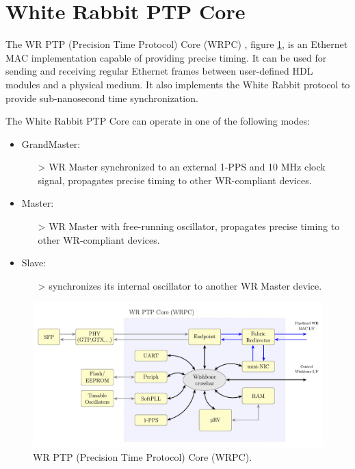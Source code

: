 \newpage
\section{White Rabbit PTP Core}

The WR PTP (Precision Time Protocol) Core (WRPC) \cite{WR-core:wiki} \cite{WR-core:manual} \cite{WRPC:ohwr}, figure \ref{fig:WRPC}, is an Ethernet MAC implementation capable of providing precise timing. 
It can be used for sending and receiving regular Ethernet frames between user-defined HDL modules and a physical medium. 
It also implements the White Rabbit protocol to provide sub-nanosecond time synchronization.

\vspace{5 mm}

\noindent The White Rabbit PTP Core can operate in one of the following modes:
 
\begin{itemize}
\item GrandMaster:
    \begin{itemize}
    \item[>] WR Master synchronized to an external 1-PPS and 10 MHz clock signal, propagates precise timing to other WR-compliant devices.
    \end{itemize}
\item Master:
    \begin{itemize}
    \item[>] WR Master with free-running oscillator, propagates precise timing to other WR-compliant devices.
    \end{itemize}
\item Slave:
    \begin{itemize}
    \item[>] synchronizes its internal oscillator to another WR Master device.
    \end{itemize}
\end{itemize}

\begin{figure}[H]
    \centering
    \includegraphics[width=15cm]{figures/WRPC.pdf}
    \caption{WR PTP (Precision Time Protocol) Core (WRPC).}
    \label{fig:WRPC}
\end{figure}

